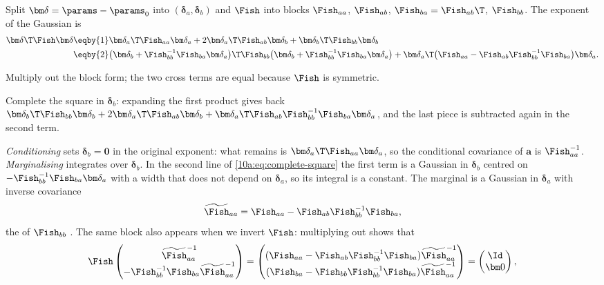 Split $\bm\delta=\params-\params_0$ into $(\bm\delta_a,\bm\delta_b)$ and $\Fish$ into blocks $\Fish_{aa}$, $\Fish_{ab}$,
$\Fish_{ba}=\Fish_{ab}\T$, $\Fish_{bb}$. The exponent of the Gaussian is
\begin{align}
  \bm\delta\T\Fish\bm\delta
  &\eqby{1}\bm\delta_a\T\Fish_{aa}\bm\delta_a+2\bm\delta_a\T\Fish_{ab}\bm\delta_b+\bm\delta_b\T\Fish_{bb}\bm\delta_b
  \nonumber\\
  &\eqby{2}\bigl(\bm\delta_b+\Fish_{bb}^{-1}\Fish_{ba}\bm\delta_a\bigr)\T\Fish_{bb}\bigl(\bm\delta_b+\Fish_{bb}^{-1}\Fish_{ba}\bm\delta_a\bigr)
  +\bm\delta_a\T\bigl(\Fish_{aa}-\Fish_{ab}\Fish_{bb}^{-1}\Fish_{ba}\bigr)\bm\delta_a .
  \label{10a:eq:complete-square}
\end{align}
\begin{explain}
  \item Multiply out the block form; the two cross terms are equal because $\Fish$ is symmetric.
  \item Complete the square in $\bm\delta_b$: expanding the first product gives back
        $\bm\delta_b\T\Fish_{bb}\bm\delta_b+2\bm\delta_a\T\Fish_{ab}\bm\delta_b+\bm\delta_a\T\Fish_{ab}\Fish_{bb}^{-1}\Fish_{ba}\bm\delta_a$, and the
        last piece is subtracted again in the second term.
\end{explain}
\emph{Conditioning} sets $\bm\delta_b=\bm0$ in the original exponent: what remains is $\bm\delta_a\T\Fish_{aa}\bm\delta_a$,
so the conditional covariance of $\bm a$ is $\Fish_{aa}^{-1}$. \emph{Marginalising} integrates over $\bm\delta_b$. In the
second line of \eqref{10a:eq:complete-square} the first term is a Gaussian in $\bm\delta_b$ centred on
$-\Fish_{bb}^{-1}\Fish_{ba}\bm\delta_a$ with a width that does not depend on $\bm\delta_a$, so its integral is a constant.
The marginal is a Gaussian in $\bm\delta_a$ with inverse covariance
\begin{equation}
  \widetilde{\Fish}_{aa}=\Fish_{aa}-\Fish_{ab}\Fish_{bb}^{-1}\Fish_{ba},
  \label{10a:eq:schur}
\end{equation}
the  of $\Fish_{bb}$ . The same block also appears when we invert $\Fish$: multiplying
out shows that
\[
  \Fish\begin{pmatrix}\widetilde{\Fish}_{aa}^{-1}\\-\Fish_{bb}^{-1}\Fish_{ba}\widetilde{\Fish}_{aa}^{-1}\end{pmatrix}
  =\begin{pmatrix}(\Fish_{aa}-\Fish_{ab}\Fish_{bb}^{-1}\Fish_{ba})\widetilde{\Fish}_{aa}^{-1}\\
   (\Fish_{ba}-\Fish_{bb}\Fish_{bb}^{-1}\Fish_{ba})\widetilde{\Fish}_{aa}^{-1}\end{pmatrix}
  =\begin{pmatrix}\Id\\ \bm0\end{pmatrix},
\]
